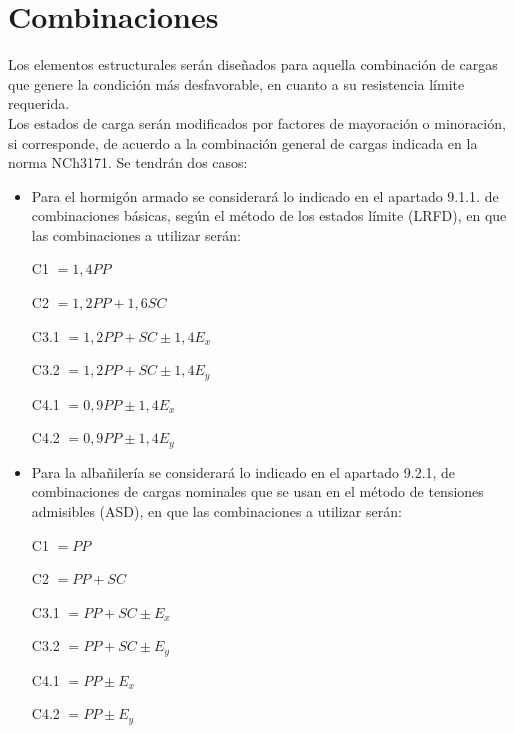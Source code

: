 \newpage
\section{Combinaciones}
Los elementos estructurales serán diseñados para aquella combinación de cargas que genere la condición más desfavorable, en cuanto a su resistencia límite requerida. \\

Los estados de carga serán modificados por factores de mayoración o minoración, si corresponde, de acuerdo a la combinación general de cargas indicada en la norma NCh3171. Se tendrán dos casos:

\begin{itemize}
    \item Para el hormigón armado se considerará lo indicado en el apartado 9.1.1. de combinaciones básicas, según el método de los estados límite (LRFD), en que las combinaciones a utilizar serán:
        
        \newcommand{\caquita}{0.8cm}    
        \hspace{\caquita} C1          $=1,4PP$
        
        \hspace{\caquita} C2          $=1,2PP+1,6SC$
        
        \hspace{\caquita} C3.1        $=1,2PP+SC\pm1,4E_x$
        
        \hspace{\caquita} C3.2        $=1,2PP+SC\pm1,4E_y$
        
        \hspace{\caquita} C4.1        $=0,9PP\pm1,4E_x$
        
        \hspace{\caquita} C4.2        $=0,9PP\pm1,4E_y$

    \item Para la albañilería se considerará lo indicado en el apartado 9.2.1, de combinaciones de cargas nominales que se usan en el método de tensiones admisibles (ASD), en que las combinaciones a utilizar serán:
    
        \hspace{\caquita} C1          $=PP$
        
        \hspace{\caquita} C2          $=PP+SC$
        
        \hspace{\caquita} C3.1        $=PP+SC\pm E_x$
        
        \hspace{\caquita} C3.2        $=PP+SC\pm E_y$
        
        \hspace{\caquita} C4.1        $=PP\pm E_x$
        
        \hspace{\caquita} C4.2        $=PP\pm E_y$\\
\end{itemize}
